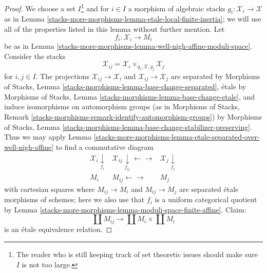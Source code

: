 \begin{proof}
We choose a set $I$\footnote{The reader who is still keeping
track of set theoretic issues should make sure $I$ is not too large.}
and for $i \in I$ a morphism of algebraic stacks
$g_i : \mathcal{X}_i \to \mathcal{X}$ as in
Lemma \ref{stacks-more-morphisms-lemma-etale-local-finite-inertia}; we will use all
of the properties listed in this lemma without further mention.
Let
$$
f_i : \mathcal{X}_i \to M_i
$$
be as in Lemma \ref{stacks-more-morphisms-lemma-well-nigh-affine-moduli-space}.
Consider the stacks
$$
\mathcal{X}_{ij} = \mathcal{X}_i \times_{g_i, \mathcal{X}, g_j} \mathcal{X}_j
$$
for $i, j \in I$. The projections $\mathcal{X}_{ij} \to \mathcal{X}_i$
and $\mathcal{X}_{ij} \to \mathcal{X}_j$ are separated
by Morphisms of Stacks, Lemma
\ref{stacks-morphisms-lemma-base-change-separated},
\'etale by Morphisms of Stacks, Lemma
\ref{stacks-morphisms-lemma-base-change-etale},
and induce isomorphisms on automorphism groups
(as in Morphisms of Stacks, Remark
\ref{stacks-morphisms-remark-identify-automorphism-groups}) by
Morphisms of Stacks, Lemma
\ref{stacks-morphisms-lemma-base-change-stabilizer-preserving}.
Thus we may apply Lemma \ref{stacks-more-morphisms-lemma-etale-separated-over-well-nigh-affine}
to find a commutative diagram
$$
\begin{array}{ccc}\mathcal{X}_i \underset{f_i}{\downarrow} & \mathcal{X}_{ij} \underset{f_{ij}}{\downarrow}\longleftarrow\longrightarrow & \mathcal{X}_j \underset{f_j}{\downarrow} \\ M_i & M_{ij} \longleftarrow\longrightarrow & M_j\end{array}
$$
with cartesian squares where $M_{ij} \to M_i$ and $M_{ij} \to M_j$
are separated \'etale morphisms of schemes; here we also use that $f_i$
is a uniform categorical quotient by
Lemma \ref{stacks-more-morphisms-lemma-moduli-space-finite-affine}.
Claim:
$$
\coprod M_{ij} \longrightarrow \coprod M_i \times \coprod M_i
$$
is an \'etale equivalence relation.


\end{proof}
